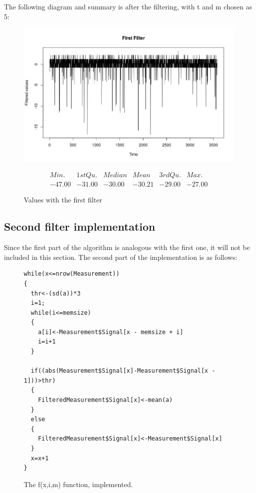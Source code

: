 The following diagram and summary is after the filtering, with t and m chosen as 5:
\begin{figure}[h!]
	\centering
		\includegraphics[width=.9\linewidth]{figures/FirstFilterZeroV1.png}
		\caption{Values with the first filter \cite{FirstFilter}}\label{fig:FirstZero}
		
		$$
		\begin{array}{cccccc}
		Min.& 1st Qu. & Median & Mean & 3rd Qu. & Max.\\
		-47.00 & -31.00 & -30.00 & -30.21 & -29.00 &   -27.00 
		\end{array}
		$$
		         
		
\end{figure}
\subsection{Second filter implementation}
Since the first part of the algorithm is analogous with the first one, it will not be included in this section.
The second part of the implementation is as follows:
\begin{figure}[h!]
\fontsize{14}{2}
	\begin{lstlisting}
while(x<=nrow(Measurement))
{
  thr<-(sd(a))*3
  i=1;
  while(i<=memsize)
  {
    a[i]<-Measurement$Signal[x - memsize + i]
    i=i+1
  }
  
  if((abs(Measurement$Signal[x]-Measurement$Signal[x - 1]))>thr)
  {
    FilteredMeasurement$Signal[x]<-mean(a)
  }
  else
  {
    FilteredMeasurement$Signal[x]<-Measurement$Signal[x]
  }
  x=x+1
}

	\end{lstlisting}
	\caption{The f(x,i,m) function, implemented.}\label{fig:code}
\end{figure} 


